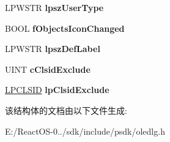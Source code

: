 \begin{DoxyCompactItemize}
L\+P\+W\+S\+TR {\bfseries lpsz\+User\+Type}
\item 
\mbox{\label{structtag_o_l_e_u_i_c_o_n_v_e_r_t_w_a2ed591d79d7a63f9bf5816e54754d41c}} 
B\+O\+OL {\bfseries f\+Objects\+Icon\+Changed}
\item 
\mbox{\label{structtag_o_l_e_u_i_c_o_n_v_e_r_t_w_a7210ad1ec2a56ed2b3973b7f6b223355}} 
L\+P\+W\+S\+TR {\bfseries lpsz\+Def\+Label}
\item 
\mbox{\label{structtag_o_l_e_u_i_c_o_n_v_e_r_t_w_adc4a7bdb6fb50e3df5bfd8e81a4d64df}} 
U\+I\+NT {\bfseries c\+Clsid\+Exclude}
\item 
\mbox{\label{structtag_o_l_e_u_i_c_o_n_v_e_r_t_w_aab711bbe4bf039ced467dced6f0eac50}} 
\hyperlink{interface_g_u_i_d}{L\+P\+C\+L\+S\+ID} {\bfseries lp\+Clsid\+Exclude}
\end{DoxyCompactItemize}


该结构体的文档由以下文件生成\+:\begin{DoxyCompactItemize}
\item 
E\+:/\+React\+O\+S-\/0../sdk/include/psdk/oledlg.\+h\end{DoxyCompactItemize}

